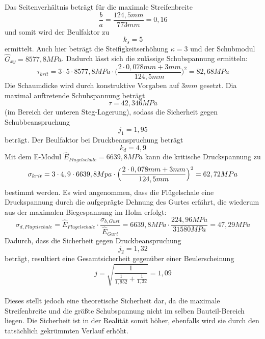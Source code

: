 \noindent Das Seitenverhältnis beträgt für die maximale Streifenbreite
\begin{equation}
	\frac{b}{a}=\frac{124,5 mm}{773 mm}=0,16
\end{equation}
und somit wird der Beulfaktor zu 
\begin{equation}
	k_{s}=5
\end{equation} 
ermittelt. Auch hier beträgt die Steifigkeitserhöhung $\kappa=3$ und der Schubmodul $\hat{G}_{xy}=8577,8 MPa$. Dadurch lässt sich die zulässige Schubspannung ermitteln:
\begin{equation}
	\tau_{krit}=3\cdot 5\cdot 8577,8 MPa\cdot\biggl(\frac{2\cdot 0,078mm + 3mm}{124,5 mm}\biggr)^{2} =82,68 MPa
\end{equation}
Die Schaumdicke wird durch konstruktive Vorgaben auf $3 mm$ gesetzt. Dia maximal auftretende Schubspannung beträgt
\begin{equation}
	\tau=42,346 MPa
\end{equation}
(im Bereich der unteren Steg-Lagerung), sodass die Sicherheit gegen Schubbeanspruchung 
\begin{equation}
	j_{1}=1,95
\end{equation}
beträgt. Der Beulfaktor bei Druckbeanspruchung beträgt
\begin{equation}
	k_{d} = 4,9
\end{equation}
Mit dem E-Modul $\hat{E}_{Fl\ddot{u}gelschale} = 6639,8 MPa$ kann die kritische Druckspannung zu
\begin{equation}
	\sigma_{krit} = 3\cdot 4,9\cdot 6639,8 Mpa\cdot\Bigl(\frac{2\cdot 0,078mm+3mm}{124,5mm}\Bigr)^{2}=62,72 MPa
\end{equation}
bestimmt werden. Es wird angenommen, dass die Flügelschale eine Druckspannung durch die aufgeprägte Dehnung des Gurtes erfährt, die wiederum aus der maximalen Biegespannung im Holm erfolgt:
\begin{equation}
	\sigma_{d,Fl\ddot{u}gelschale}=\hat{E}_{Fl\ddot{u}gelschale}\cdot\frac{\sigma_{b,Gurt}}{\hat{E}_{Gurt}}=6639,8 MPa\cdot\frac{224,96 MPa}{31580 MPa}=47,29 MPa
\end{equation}
Dadurch, dass die Sicherheit gegen Druckbeanspruchung
\begin{equation}
	j_{2}=1,32
\end{equation}
beträgt, resultiert eine Gesamtsicherheit gegenüber einer Beulerscheinung
\begin{equation}\label{Hautbeulen}
	j=\sqrt{\frac{1}{\frac{1}{1,952}+\frac{1}{1,32}}}=1,09
\end{equation}\\

 \noindent Dieses stellt jedoch eine theoretische Sicherheit dar, da die maximale Streifenbreite und die größte Schubspannung nicht im selben Bauteil-Bereich liegen. Die Sicherheit ist in der Realität somit höher, ebenfalls wird sie durch den tatsächlich gekrümmten Verlauf erhöht.